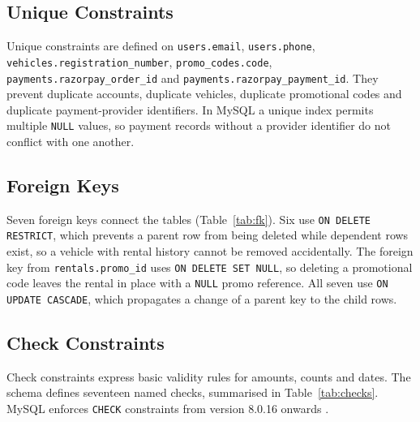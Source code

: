 \documentclass[10pt,a4paper]{report}
\newcommand{\col}[1]{\texttt{#1}}
\begin{document}
\subsection{Unique Constraints}
Unique constraints are defined on \col{users.email}, \col{users.phone}, \col{vehicles.registration_number}, \col{promo_codes.code}, \col{payments.razorpay_order_id} and \col{payments.razorpay_payment_id}. They prevent duplicate accounts, duplicate vehicles, duplicate promotional codes and duplicate payment-provider identifiers. In MySQL a unique index permits multiple \col{NULL} values, so payment records without a provider identifier do not conflict with one another.

\subsection{Foreign Keys}
Seven foreign keys connect the tables (Table~\ref{tab:fk}). Six use \col{ON DELETE RESTRICT}, which prevents a parent row from being deleted while dependent rows exist, so a vehicle with rental history cannot be removed accidentally. The foreign key from \col{rentals.promo_id} uses \col{ON DELETE SET NULL}, so deleting a promotional code leaves the rental in place with a \col{NULL} promo reference. All seven use \col{ON UPDATE CASCADE}, which propagates a change of a parent key to the child rows.

\subsection{Check Constraints}
Check constraints express basic validity rules for amounts, counts and dates. The schema defines seventeen named checks, summarised in Table~\ref{tab:checks}. MySQL enforces \col{CHECK} constraints from version 8.0.16 onwards \cite{mysqlcreate}.
\end{document}
